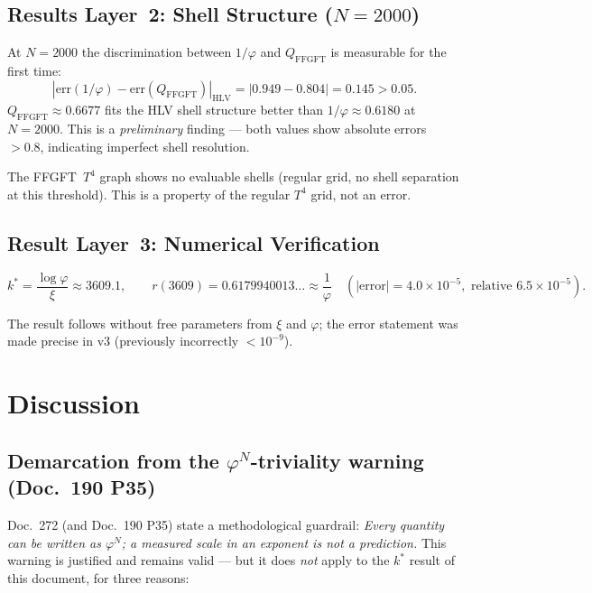 \subsection{Results Layer~2: Shell Structure ($N=2000$)}

At $N=2000$ the discrimination between $1/\varphi$ and $Q_\mathrm{FFGFT}$
is measurable for the first time:
\begin{equation}
  |\mathrm{err}(1/\varphi) - \mathrm{err}(Q_\mathrm{FFGFT})|_\mathrm{HLV}
  = |0.949 - 0.804| = 0.145 > 0.05.
\end{equation}
$Q_\mathrm{FFGFT} \approx 0.6677$ fits the HLV shell structure better than
$1/\varphi \approx 0.6180$ at $N=2000$. This is a \emph{preliminary} finding
--- both values show absolute errors~$> 0.8$, indicating imperfect shell
resolution.

The FFGFT~$T^4$ graph shows no evaluable shells (regular grid, no shell
separation at this threshold). This is a property of the regular $T^4$
grid, not an error.

\subsection{Result Layer~3: Numerical Verification}

\begin{equation}
  k^* = \frac{\log\varphi}{\xi} \approx 3609.1,
  \qquad
  r(3609) = 0.6179940013\ldots \approx \frac{1}{\varphi}
  \quad (|\text{error}| = 4.0\times10^{-5},
  \text{ relative } 6.5\times10^{-5}).
\end{equation}

The result follows without free parameters from $\xi$ and $\varphi$;
the error statement was made precise in v3 (previously incorrectly $<10^{-9}$).

\section{Discussion}

\subsection{Demarcation from the $\varphi^N$-triviality warning (Doc.~190 P35)}

Doc.~272 (and Doc.~190 P35) state a methodological guardrail:
\emph{Every quantity can be written as $\varphi^N$; a measured scale in an
exponent is not a prediction.} This warning is justified and remains
valid --- but it does \emph{not} apply to the $k^*$ result of this document,
for three reasons:

